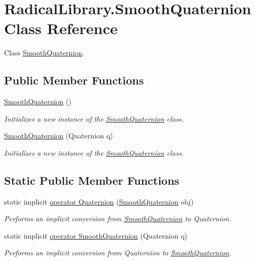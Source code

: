 \hypertarget{class_radical_library_1_1_smooth_quaternion}{}\section{Radical\+Library.\+Smooth\+Quaternion Class Reference}
\label{class_radical_library_1_1_smooth_quaternion}


Class \hyperlink{class_radical_library_1_1_smooth_quaternion}{Smooth\+Quaternion}.  


\subsection*{Public Member Functions}
\begin{DoxyCompactItemize}
\item 
\hyperlink{class_radical_library_1_1_smooth_quaternion_a4425a9085af5f9b3c44286e8cfcdb154}{Smooth\+Quaternion} ()
\begin{DoxyCompactList}\small\item\em Initializes a new instance of the \hyperlink{class_radical_library_1_1_smooth_quaternion}{Smooth\+Quaternion} class. \end{DoxyCompactList}\item 
\hyperlink{class_radical_library_1_1_smooth_quaternion_aae3b7898e4f71eb1540fd0d31c2b7e72}{Smooth\+Quaternion} (Quaternion q)
\begin{DoxyCompactList}\small\item\em Initializes a new instance of the \hyperlink{class_radical_library_1_1_smooth_quaternion}{Smooth\+Quaternion} class. \end{DoxyCompactList}\end{DoxyCompactItemize}
\subsection*{Static Public Member Functions}
\begin{DoxyCompactItemize}
\item 
static implicit \hyperlink{class_radical_library_1_1_smooth_quaternion_a8ff1a27e2ca9ca02514e311abb4808f0}{operator Quaternion} (\hyperlink{class_radical_library_1_1_smooth_quaternion}{Smooth\+Quaternion} obj)
\begin{DoxyCompactList}\small\item\em Performs an implicit conversion from \hyperlink{class_radical_library_1_1_smooth_quaternion}{Smooth\+Quaternion} to Quaternion. \end{DoxyCompactList}\item 
static implicit \hyperlink{class_radical_library_1_1_smooth_quaternion_a08a76bbeb19fdfadcf3d092b8f86030d}{operator Smooth\+Quaternion} (Quaternion q)
\begin{DoxyCompactList}\small\item\em Performs an implicit conversion from Quaternion to \hyperlink{class_radical_library_1_1_smooth_quaternion}{Smooth\+Quaternion}. \end{DoxyCompactList}\end{DoxyCompactItemize}
